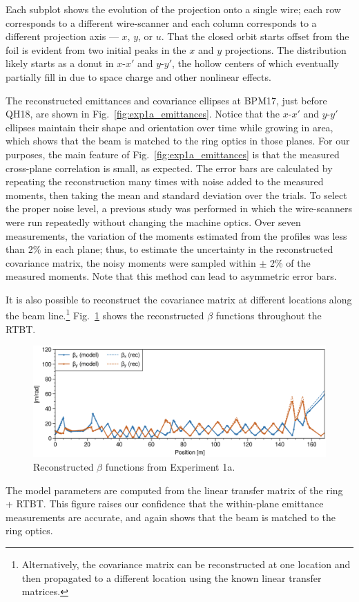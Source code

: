 %
Each subplot shows the evolution of the projection onto a single wire; each row corresponds to a different wire-scanner and each column corresponds to a different projection axis — $x$, $y$, or $u$. That the closed orbit starts offset from the foil is evident from two initial peaks in the $x$ and $y$ projections. The distribution likely starts as a donut in $x$-$x'$ and $y$-$y'$, the hollow centers of which eventually partially fill in due to space charge and other nonlinear effects.

The reconstructed emittances and covariance ellipses at BPM17, just before QH18, are shown in Fig.~\ref{fig:exp1a_emittances}. Notice that the $x$-$x'$ and $y$-$y'$ ellipses maintain their shape and orientation over time while growing in area, which shows that the beam is matched to the ring optics in those planes. For our purposes, the main feature of Fig.~\ref{fig:exp1a_emittances} is that the measured cross-plane correlation is small, as expected. The error bars are calculated by repeating the reconstruction many times with noise added to the measured moments, then taking the mean and standard deviation over the trials.  To select the proper noise level, a previous study was performed in which the wire-scanners were run repeatedly without changing the machine optics. Over seven measurements, the variation of the moments estimated from the profiles was less than 2\% in each plane; thus, to estimate the uncertainty in the reconstructed covariance matrix, the noisy moments were sampled within $\pm$ 2\% of the measured moments. Note that this method can lead to asymmetric error bars.

It is also possible to reconstruct the covariance matrix at different locations along the beam line.\footnote{Alternatively, the covariance matrix can be reconstructed at one location and then propagated to a different location using the known linear transfer matrices.}  Fig.~\ref{fig:exp1a_rec_betas_throughout} shows the reconstructed $\beta$ functions throughout the RTBT.
%
\begin{figure}[!p]
    \centering
    \includegraphics[width=1.0\textwidth]{Images/chapter5/exp1a/rec_betas_throughout.png}
    \caption{Reconstructed $\beta$ functions from Experiment 1a.}
    \label{fig:exp1a_rec_betas_throughout}
\end{figure}
%
The model parameters are computed from the linear transfer matrix of the ring + RTBT. This figure raises our confidence that the within-plane emittance measurements are accurate, and again shows that the beam is matched to the ring optics.



